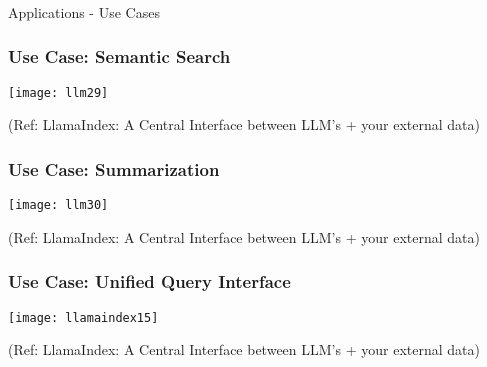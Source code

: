 \begin{frame}[fragile]\frametitle{}
\begin{center}
{\Large Applications - Use Cases}
\end{center}
\end{frame}


\begin{frame}[fragile]\frametitle{Use Case: Semantic Search}

\begin{center}
\texttt{[image: llm29]}

{\tiny (Ref: LlamaIndex: A Central Interface between LLM’s + your external data)}
\end{center}
\end{frame}

\begin{frame}[fragile]\frametitle{Use Case: Summarization}

\begin{center}
\texttt{[image: llm30]}

{\tiny (Ref: LlamaIndex: A Central Interface between LLM’s + your external data)}
\end{center}
\end{frame}

\begin{frame}[fragile]\frametitle{Use Case: Unified Query Interface}

\begin{center}
\texttt{[image: llamaindex15]}

{\tiny (Ref: LlamaIndex: A Central Interface between LLM’s + your external data)}
\end{center}
\end{frame}


